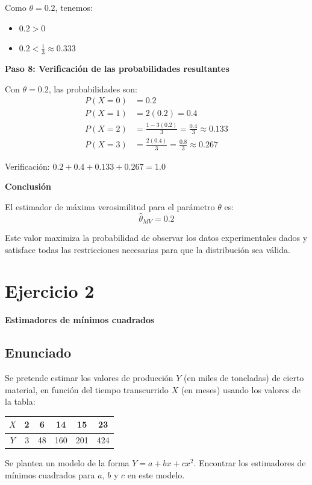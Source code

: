 \documentclass[11pt,a4paper]{article}
\begin{document}
Como $\theta = 0.2$, tenemos:
\begin{itemize}
    \item $0.2 > 0$ \checkmark
    \item $0.2 < \frac{1}{3} \approx 0.333$ \checkmark
\end{itemize}

\textbf{Paso 8: Verificación de las probabilidades resultantes}

Con $\theta = 0.2$, las probabilidades son:
\begin{align*}
P(X=0) &= 0.2 \\
P(X=1) &= 2(0.2) = 0.4 \\
P(X=2) &= \frac{1-3(0.2)}{3} = \frac{0.4}{3} \approx 0.133 \\
P(X=3) &= \frac{2(0.4)}{3} = \frac{0.8}{3} \approx 0.267
\end{align*}

Verificación: $0.2 + 0.4 + 0.133 + 0.267 = 1.0$ \checkmark

\textbf{Conclusión}

El estimador de máxima verosimilitud para el parámetro $\theta$ es:
\[
\boxed{\hat{\theta}_{MV} = 0.2}
\]

Este valor maximiza la probabilidad de observar los datos experimentales dados y satisface todas las restricciones necesarias para que la distribución sea válida.

\section{Ejercicio 2}
\textbf{Estimadores de mínimos cuadrados}

\subsection{Enunciado}
Se pretende estimar los valores de producción $Y$ (en miles de toneladas) de cierto material, en función del tiempo transcurrido $X$ (en meses) usando los valores de la tabla:

\begin{center}
\begin{tabular}{|c|c|c|c|c|c|}
\hline
$X$ & 2 & 6 & 14 & 15 & 23 \\
\hline
$Y$ & 3 & 48 & 160 & 201 & 424 \\
\hline
\end{tabular}
\end{center}

Se plantea un modelo de la forma $Y = a + bx + cx^2$. Encontrar los estimadores de mínimos cuadrados para $a$, $b$ y $c$ en este modelo.
\end{document}
